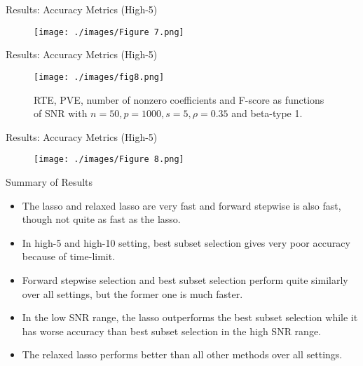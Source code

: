 \documentclass[blue, 10pt]{beamer}
\begin{document}
\begin{frame}{Results: Accuracy Metrics (High-5)}

  \begin{figure}
    \centering
    \texttt{[image: ./images/Figure 7.png]}
  \end{figure}

\end{frame}


\begin{frame}{Results: Accuracy Metrics (High-5)}

  \begin{figure}
    \centering
    \texttt{[image: ./images/fig8.png]}
    \caption{RTE, PVE, number of nonzero coefficients and F-score as functions of SNR with $n = 50, p = 1000, s = 5, \rho = 0.35$ and beta-type 1.}
  \end{figure}

\end{frame}


\begin{frame}{Results: Accuracy Metrics (High-5)}

  \begin{figure}
    \centering
    \texttt{[image: ./images/Figure 8.png]}
  \end{figure}

\end{frame}


\begin{frame}{Summary of Results}

  \begin{itemize}
    \item The lasso and relaxed lasso are very fast and forward stepwise is also fast, though not quite as fast as the lasso.
    \item In high-5 and high-10 setting, best subset selection gives very poor accuracy because of time-limit.
    \item Forward stepwise selection and best subset selection perform quite similarly over all settings, but the former one is much faster.
    \item In the low SNR range, the lasso outperforms the best subset selection while it has worse accuracy than best subset selection in the high SNR range.
    \item The relaxed lasso performs better than all other methods over all settings.
  \end{itemize}

\end{frame}
\end{document}

